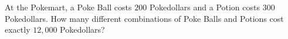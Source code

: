 At the Pokemart, a Poke Ball costs $200$ Pokedollars and a Potion costs $300$ Pokedollars. How many different combinations of Poke Balls and Potions cost exactly $12{,}000$ Pokedollars?
